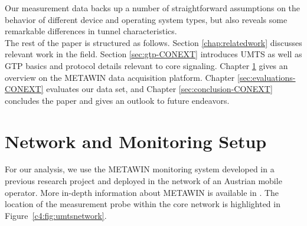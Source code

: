 Our measurement data backs up a number of straightforward assumptions on the behavior of different device and operating system types, but also reveals some remarkable differences in tunnel characteristics.\\

The rest of the paper is structured as follows. Section \ref{chap:relatedwork} discusses relevant work in the field. Section \ref{sec:gtp-CONEXT} introduces \ac{UMTS} as well as \ac{GTP} basics and protocol details relevant to core signaling. Chapter \ref{sec:darwin-CONEXT} gives an overview on the \acs{METAWIN} data acquisition platform. Chapter \ref{sec:evaluations-CONEXT} evaluates our data set, and Chapter \ref{sec:conclusion-CONEXT} concludes the paper and gives an outlook to future endeavors.





\section{Network and Monitoring Setup}
\label{sec:darwin-CONEXT}



For our analysis, we use the \ac{METAWIN} monitoring system developed in a previous research project
and deployed in the network of an Austrian mobile operator.  More in-depth information about \ac{METAWIN} is available in \cite{ricciato_2011}.
The location of the measurement probe within the core network is highlighted in Figure~\ref{c4:fig:umtsnetwork}. 

